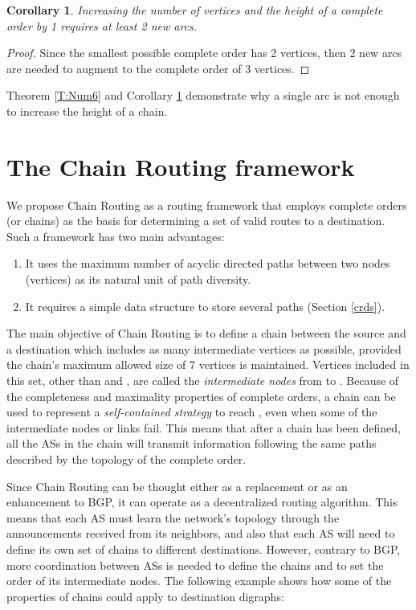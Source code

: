 \documentclass[5p,twocolumn]{elsarticle}
\newtheorem{corollary}[theorem]{Corollary}
\begin{document}
\begin{corollary}\label{T:Num7}
Increasing the number of vertices and the height of a complete order by 1 requires at least 2 new arcs.
\end{corollary}

\begin{proof}
Since the smallest possible complete order has 2 vertices, then 2 new arcs are needed to augment to the complete order of 3 vertices.
\end{proof}

Theorem \ref{T:Num6} and Corollary \ref{T:Num7} demonstrate why a single arc is not enough to increase the height of a chain.




\section{The Chain Routing framework}\label{chain_rtg}

We propose Chain Routing as a routing framework that employs complete orders (or chains) as the basis for determining a set of valid routes to a destination. Such a framework has two main advantages:

\begin{enumerate}
	\item It uses the maximum number of acyclic directed paths between two nodes (vertices) as its natural unit of path diversity.
	\item It requires a simple data structure to store several paths (Section \ref{crds}).
\end{enumerate}

The main objective of Chain Routing is to define a chain between the source  and a destination  which includes as many intermediate vertices as possible, provided the chain's maximum allowed size of 7 vertices is maintained. Vertices included in this set, other than  and , are called the \emph{intermediate nodes} from  to . Because of the completeness and maximality properties of complete orders, a chain can be used to represent a \emph{self-contained strategy} to reach , even when some of the intermediate nodes or links fail. This means that after a chain has been defined, all the ASs in the chain will transmit information following the same paths described by the topology of the complete order.

Since Chain Routing can be thought either as a replacement or as an enhancement to BGP, it can operate as a decentralized routing algorithm. This means that each AS must learn the network's topology through the announcements received from its neighbors, and also that each AS will need to define its own set of chains to different destinations. However, contrary to BGP, more coordination between ASs is needed to define the chains and to set the order of its intermediate nodes. The following example shows how some of the properties of chains could apply to destination digraphs:
\end{document}
